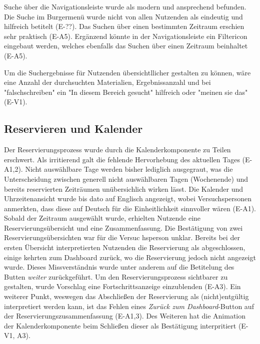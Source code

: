 Suche über die Navigationsleiste wurde als modern und ansprechend befunden. Die
Suche im Burgermenü wurde nicht von allen Nutzenden als eindeutig und hilfreich
betitelt (E-??). Das Suchen über einen bestimmten Zeitraum erschien sehr praktisch
(E-A5). Ergänzend könnte in der Navigationsleiste ein Filtericon eingebaut
werden, welches ebenfalls das Suchen über einen Zeitraum beinhaltet (E-A5).

Um die Suchergebnisse für Nutzenden übersichtllicher gestalten zu können, wäre eine Anzahl der
durchsuchten Materialien, Ergebnissanzahl und bei "falschschreiben" ein "In diesem Bereich gesucht"
hilfreich oder "meinen sie das" (E-V1). 

\subsection{Reservieren und Kalender}
Der Reservierungsprozess wurde durch die Kalenderkomponente zu Teilen erschwert. Als irritierend
galt die fehlende Hervorhebung des aktuellen Tages (E-A1,2). Nicht auswählbare Tage werden bisher
lediglich ausgegraut, was die Unterscheidung zwischen generell nicht auswählbaren Tagen (Wochenende)
und bereits reservierten Zeiträumen unübersichlich wirken lässt. Die Kalender und Uhrzeitenansicht
wurde bis dato auf Englisch angezeigt, wobei Versuchspersonen anmerkten, dass diese auf Deutsch für
die Einheitlichkeit sinnvoller wären (E-A1). Sobald der Zeitraum ausgewählt wurde, erhielten
Nutzende eine Reservierungsübersicht und eine Zusammenfassung. Die Bestätigung von zwei
Reservierungsübersichten war für die Versuc
hsperson unklar. Bereits bei der ersten Übersicht
interpretierten Nutzenden die Reservierung als abgeschlossen, einige kehrten zum Dashboard zurück,
wo die Reservierung jedoch nicht angezeigt wurde. Dieses Missverständnis wurde unter anderem auf die
Betitelung des Butten \textit{weiter} zurückgeführt. Um den Reservierungsprozess sichtbarer zu
gestalten, wurde Vorschlag eine Fortschrittsanzeige einzublenden (E-A3). Ein weiterer Punkt,
weswegen das Abschließen der Reservierung als (nicht)entgültig interpretiert werden kann, ist das
Fehlen eines \textit{Zurück zum Dashboard}-Button auf der Reservierungszusammenfassung (E-A1,3). Des
Weiteren hat die Animation der Kalenderkomponente beim Schließen dieser als Bestätigung
interpritiert (E-V1, A3).


